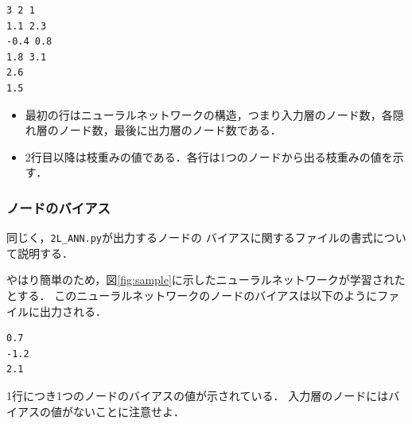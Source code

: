 \documentclass[11pt, titlepage, dvipdfmx, twoside]{jarticle}
\newcommand{\figref}[1]{図\ref{fig:#1}}
\begin{document}
\begin{oframed}
{\small
\begin{verbatim}
3 2 1
1.1 2.3
-0.4 0.8
1.8 3.1
2.6
1.5
\end{verbatim}
}
\end{oframed}
\begin{itemize}
\item 最初の行はニューラルネットワークの構造，つまり入力層のノード数，各隠れ層のノード数，最後に出力層のノード数である．
\item 2行目以降は枝重みの値である．各行は1つのノードから出る枝重みの値を示す．
\end{itemize}


\subsubsection{ノードのバイアス}
同じく，\verb|2L_ANN.py|が出力するノードの
バイアスに関するファイルの書式について説明する．

やはり簡単のため，\figref{sample}に示したニューラルネットワークが学習されたとする．
このニューラルネットワークのノードのバイアスは以下のようにファイルに出力される．

\begin{oframed}
{\small
\begin{verbatim}
0.7
-1.2
2.1
\end{verbatim}
}
\end{oframed}
1行につき1つのノードのバイアスの値が示されている．
入力層のノードにはバイアスの値がないことに注意せよ．

\end{document}
